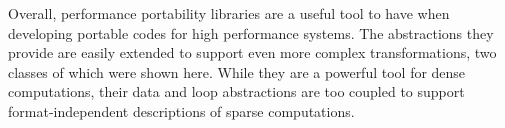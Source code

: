 Overall, performance portability libraries are a useful tool to have when developing portable codes for high performance systems.
The abstractions they provide are easily extended to support even more complex transformations, two classes of which were shown here.
While they are a powerful tool for dense computations, their data and loop abstractions are too coupled to support format-independent descriptions of sparse computations.


